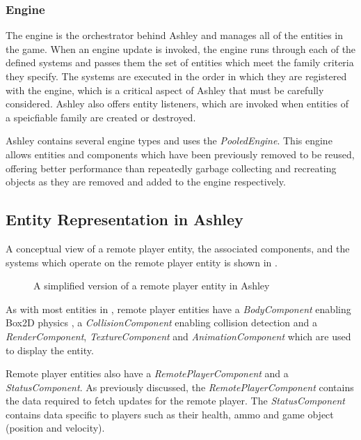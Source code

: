 \subsubsection{Engine}
The engine is the orchestrator behind Ashley and manages all of the entities in the game. When an engine update is invoked, the engine runs through each of the defined systems and passes them the set of entities which meet the family criteria they specify. The systems are executed in the order in which they are registered with the engine, which is a critical aspect of Ashley that must be carefully considered. Ashley also offers entity listeners, which are invoked when entities of a speicfiable family are created or destroyed.

Ashley contains several engine types and \game{} uses the \textit{PooledEngine}. This engine allows entities and components  which have been previously removed to be reused, offering better performance than repeatedly garbage collecting and recreating objects as they are removed and added to the engine respectively. 
 
\subsection{Entity Representation in Ashley}
A conceptual view of a remote player entity, the associated components, and the systems which operate on the remote player entity is shown in . 

\begin{figure}[H]
    \centering
    \caption{A simplified version of a remote player entity in Ashley}
    \label{fig:impl:ashley}
\end{figure}

As with most entities in \game{}, remote player entities have a \textit{BodyComponent} enabling Box2D physics , a \textit{CollisionComponent} enabling collision detection and a \textit{RenderComponent}, \textit{TextureComponent} and \textit{AnimationComponent} which are used to display the entity. 

Remote player entities also have a \textit{RemotePlayerComponent} and a \textit{StatusComponent}. As previously discussed, the \textit{RemotePlayerComponent} contains the data required to fetch updates for the remote player. The \textit{StatusComponent} contains data specific to players such as their health, ammo and game object (position and velocity). 

